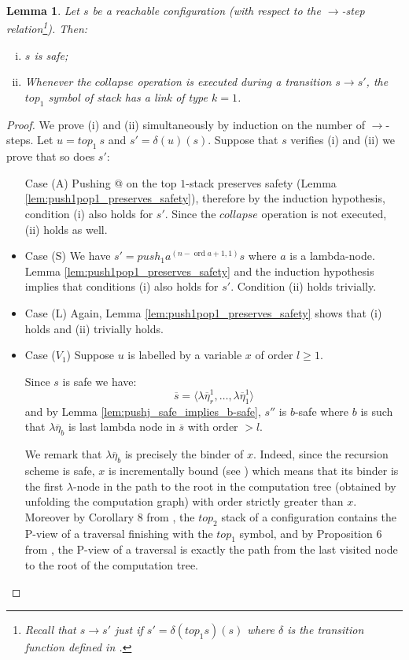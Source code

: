 \documentclass{article}
\newcommand{\ord}{\mathop{\mathrm{ord}}}
\newtheorem{lemma}{Lemma}[section]
\theoremstyle{remark}
\theoremstyle{definition}
\newcommand\orddec\overline
\begin{document}
\begin{lemma}
Let $s$ be a reachable configuration (with respect to the
$\rightarrow$-step relation\footnote{Recall that $s\rightarrow s'$
just if $s' = \delta(top_1 s)(s)$ where $\delta$ is the transition
function defined in \cite[Figure 2]{hague-sto07}.}). Then:
\begin{enumerate}[i.]
\item $s$ is safe;
\item Whenever the $collapse$ operation is executed during a
transition $s \rightarrow s'$, the $top_1$ symbol of stack has a
link of type $k=1$.
\end{enumerate}
\end{lemma}
\begin{proof}
We prove (i) and (ii) simultaneously by induction on the number of
$\rightarrow$-steps. Let $u = top_1\ s$ and $s' =\delta(u)(s)$.
Suppose that $s$ verifies (i) and (ii) we prove that so does $s'$:
\begin{itemize}
\item[Case (A)] Pushing @ on the top $1$-stack preserves safety (Lemma
\ref{lem:push1pop1_preserves_safety}), therefore by the
induction hypothesis, condition (i) also holds for $s'$. Since
the $collapse$ operation is not executed, (ii) holds as well.

\item Case (S)
We have $s' = push_1 a^{(n-\ord{a}+1,1)} s$ where $a$ is a
lambda-node. Lemma \ref{lem:push1pop1_preserves_safety} and the
induction hypothesis implies that conditions (i) also holds for
$s'$. Condition (ii) holds trivially.

\item Case (L) Again, Lemma \ref{lem:push1pop1_preserves_safety}
shows that (i) holds and (ii) trivially holds.

\item Case ($V_1$) Suppose $u$ is labelled by a variable $x$ of order $l\geq 1$.

Since $s$ is safe we have:
\begin{equation*}
 \orddec{s} = \langle \lambda \overline{\eta}_r^1
, \ldots, \lambda \overline{\eta}_1^1   \rangle
\end{equation*}
and by Lemma \ref{lem:pushj_safe_implies_b-safe}, $s''$ is $b$-safe where $b$ is such that $\lambda \overline{\eta}_{b}$ is last lambda node in $\orddec{s}$ with order $>l$.


We remark that $\lambda \overline{\eta}_{b}$ is precisely the binder of $x$.
Indeed, since the recursion scheme is safe, $x$ is incrementally bound
 (see \cite{blumong:safelambdacalculus}) which means that its
 binder is the first $\lambda$-node in the path to the root in
 the computation tree (obtained by unfolding the computation
 graph) with order strictly greater than $x$. Moreover by Corollary 8
 from \cite{hague-sto07}, the $top_2$ stack of a configuration
 contains the P-view of a traversal finishing with the $top_1$
 symbol, and by Proposition 6 from \cite{OngLics2006}, the
 P-view of a traversal is exactly the path from the last visited
 node to the root of the computation tree. 


\end{itemize}
\end{proof}
\end{document}
